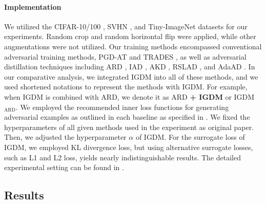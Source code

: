 \documentclass{article} %
\begin{document}
\paragraph{Implementation}
We utilized the CIFAR-10/100 \citep{krizhevsky2009learning}, SVHN \citep{svhn}, and Tiny-ImageNet \citep{le2015tiny} datasets for our experiments.
Random crop and random horizontal flip were applied, while other augmentations were not utilized.
Our training methods encompassed conventional adversarial training methods, PGD-AT \citep{PGD} and TRADES \citep{TRADES}, as well as adversarial distillation techniques including ARD \citep{ard}, IAD \citep{iad}, AKD \citep{akd}, RSLAD \citep{rslad}, and AdaAD \citep{adaad}.
In our comparative analysis, we integrated IGDM into all of these methods, and we used shortened notations to represent the methods with IGDM. 
For example, when IGDM is combined with ARD, we denote it as ARD \textbf{+ IGDM} or IGDM$_{\text{ARD}}$.
We employed the recommended inner loss functions for generating adversarial examples as outlined in each baseline as specified in .
We fixed the hyperparameters of all given methods used in the experiment as original paper.
Then, we adjusted the hyperparameter $\alpha$ of IGDM.
For the surrogate loss of IGDM, we employed KL divergence loss, but using alternative surrogate losses, such as L1 and L2 loss, yields nearly indistinguishable results.
The detailed experimental setting can be found in .










































\subsection{Results}
\end{document}
